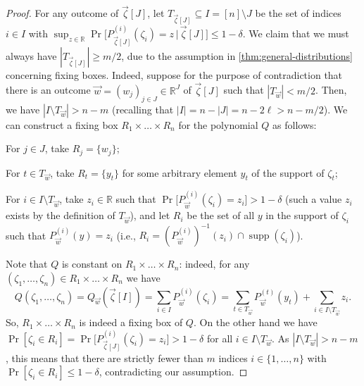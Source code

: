 \documentclass[english]{article}
\theoremstyle{remark}
\numberwithin{equation}{section}
\numberwithin{figure}{section}
\newcommand{\su}{\subseteq}
\newcommand{\RR}{\mathbb{R}}
\begin{document}
\begin{proof}
For any outcome of $\vec \zeta[J]$, let $T_{\vec \zeta[J]}\su I=[n]\setminus J$ be the set of indices $i\in I$ with $\sup_{z\in\RR}\Pr\bigl[P^{(i)}_{\vec \zeta[J]}(\zeta_i)=z\,\big|\,\vec \zeta[J]\bigr]\le 1-\delta$. We claim that we must always have $|T_{\vec \zeta[J]}|\ge m/2$, due to the assumption in \cref{thm:general-distributions} concerning fixing boxes. 
Indeed, suppose for the purpose of contradiction that there is an outcome $\vec w=(w_j)_{j\in J}\in \RR^J$ of $\vec \zeta[J]$ such that $|T_{\vec w}|< m/2$. Then, we have $|I\setminus T_{\vec w}|> n-m$ (recalling that $|I|=n-|J|=n-2\ell>n-m/2$).
We can construct a fixing box $R_1\times \dots\times R_n$ for the polynomial $Q$ as follows:
\begin{compactitem}
    \item For $j\in J$, take $R_j=\{w_j\}$;
    \item For $t\in T_{\vec w}$, take $R_t=\{y_t\}$ for some arbitrary element $y_t$ of the support of $\zeta_t$;
    \item For $i\in I\setminus T_{\vec w}$, take $z_i\in \RR$ such that $\Pr\bigl[P^{(i)}_{\vec w}(\zeta_i)=z_i\bigr]>1-\delta$ (such a value $z_i$ exists by the definition of $T_{\vec w}$), and let $R_i$ be the set of all $y$ in the support of $\zeta_i$ such that $P_{\vec w}^{(i)}(y)=z_i$ (i.e., $R_i=(P_{\vec w}^{(i)})^{-1}(z_i)\cap \operatorname{supp}(\zeta_i)$).
\end{compactitem}
Note that $Q$ is constant on $R_1\times \dots\times R_n$: indeed, for any $(\zeta_1,\dots,\zeta_n)\in R_1\times\dots\times R_n$ we have \[Q(\zeta_1,\dots,\zeta_n)=Q_{\vec w}(\vec \zeta[I])=\sum_{i\in I} P_{\vec w}^{(i)}(\zeta_i)=\sum_{t\in T_{\vec w}}P_{\vec w}^{(t)}(y_t)+\sum_{i\in I\setminus T_{\vec w}}z_i.\] So, $R_1\times \dots\times R_n$ is indeed a fixing box of $Q$. On the other hand we have $\Pr[\zeta_i\in R_i]=\Pr\bigl[P^{(i)}_{\vec \zeta[J]}(\zeta_i)=z_i\bigr]> 1-\delta$ for all $i\in I\setminus T_{\vec w}$. As $|I\setminus T_{\vec w}|> n-m$, this means that there are strictly fewer than $m$ indices $i\in \{1,\dots,n\}$ with $\Pr[\zeta_i\in R_i]\le 1-\delta$, contradicting our assumption.


\end{proof}
\end{document}
